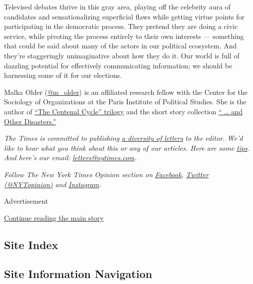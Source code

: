 Televised debates thrive in this gray area, playing off the celebrity
aura of candidates and sensationalizing superficial flaws while getting
virtue points for participating in the democratic process. They pretend
they are doing a civic service, while pivoting the process entirely to
their own interests --- something that could be said about many of the
actors in our political ecosystem. And they're staggeringly
unimaginative about how they do it. Our world is full of dazzling
potential for effectively communicating information; we should be
harnessing some of it for our elections.

Malka Older (\href{https://twitter.com/m_older}{@m\_older}) is an
affiliated research fellow with the Center for the Sociology of
Organizations at the Paris Institute of Political Studies. She is the
author of
\href{https://publishing.tor.com/infomocracy-malkaolder/9780765392367/}{``The
Centenal Cycle'' trilogy} and the short story collection
\href{http://www.masonjarpress.xyz/chapbooks-1/and-other-disasters}{``
\ldots{} and Other Disasters.''}

\emph{The Times is committed to publishing}
\href{https://www.nytimes.com/2019/01/31/opinion/letters/letters-to-editor-new-york-times-women.html}{\emph{a
diversity of letters}} \emph{to the editor. We'd like to hear what you
think about this or any of our articles. Here are some}
\href{https://help.nytimes.com/hc/en-us/articles/115014925288-How-to-submit-a-letter-to-the-editor}{\emph{tips}}\emph{.
And here's our email:}
\href{mailto:letters@nytimes.com}{\emph{letters@nytimes.com}}\emph{.}

\emph{Follow The New York Times Opinion section on}
\href{https://www.facebook.com/nytopinion}{\emph{Facebook}}\emph{,}
\href{http://twitter.com/NYTOpinion}{\emph{Twitter (@NYTopinion)}}
\emph{and}
\href{https://www.instagram.com/nytopinion/}{\emph{Instagram}}\emph{.}

Advertisement

\protect\hyperlink{after-bottom}{Continue reading the main story}

\hypertarget{site-index}{%
\subsection{Site Index}\label{site-index}}

\hypertarget{site-information-navigation}{%
\subsection{Site Information
Navigation}\label{site-information-navigation}}

